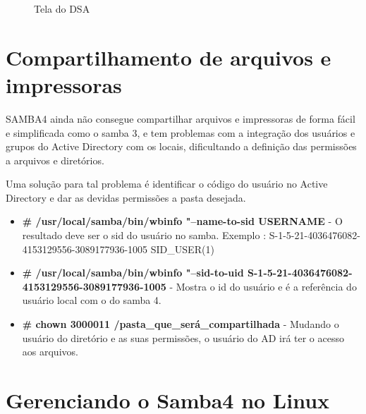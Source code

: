 \begin{figure}[ht]
   	\centering
   	\caption{Tela do DSA}
    \label{tela_dsa}
\end{figure}


\section{Compartilhamento de arquivos e impressoras}

SAMBA4 ainda não consegue compartilhar arquivos e impressoras de forma fácil e simplificada como o samba 3, e tem problemas com a integração dos usuários e grupos do Active Directory com os locais, dificultando a definição das permissões a arquivos e diretórios.

Uma solução para tal problema é identificar o código do usuário no Active Directory e dar as devidas permissões a pasta desejada.

\begin{itemize}
	\item \textbf{\# /usr/local/samba/bin/wbinfo "--name-to-sid USERNAME} - O resultado deve ser o sid do usuário no samba. Exemplo : S-1-5-21-4036476082-4153129556-3089177936-1005 SID\_USER(1)
	\item \textbf{\# /usr/local/samba/bin/wbinfo "--sid-to-uid S-1-5-21-4036476082-4153129556-3089177936-1005} - Mostra o id do usuário e é a referência do usuário local com o do samba 4.
	\item \textbf{\# chown 3000011 /pasta\_que\_será\_compartilhada} - Mudando o usuário do diretório e as suas permissões, o usuário do AD irá ter o acesso aos arquivos.
\end{itemize} 

\section{Gerenciando o Samba4 no Linux}

